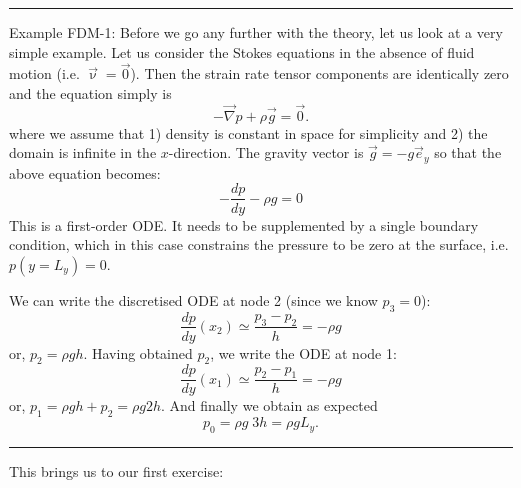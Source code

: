 \begin{center}
\begin{minipage}[t]{0.77\textwidth}
\par\noindent\rule{\textwidth}{0.4pt}
{\color{blue}Example FDM-1:} Before we go any further with the theory, let us look at a very simple example. 
Let us consider the Stokes equations in the absence of fluid motion (i.e. $\vec\upnu=\vec 0$).
Then the strain rate tensor components are identically zero and the equation simply is 
\begin{equation}
-\vec\nabla p + \rho \vec{g} = \vec 0.
\end{equation}
where we assume that 1) density is constant in space for simplicity and 2)
the domain is infinite in the $x$-direction.
The gravity vector is $\vec{g}=-g \vec{e}_y$ so that the above equation 
becomes:
\begin{equation}
-\frac{dp}{dy} - \rho g = 0
\end{equation}
This is a first-order ODE. It needs to be supplemented by a single boundary condition, 
which in this case constrains the pressure to be zero at the surface, i.e. $p(y=L_y)=0$.

\begin{center}

\end{center}

We can write the discretised ODE at node 2 (since we know $p_3=0$):
\begin{equation}
\frac{dp}{dy}(x_2) \simeq \frac{p_3-p_2}{h} = -\rho g
\end{equation}
or, $p_2=\rho g h$. Having obtained $p_2$, we write the ODE at node 1:
\begin{equation}
\frac{dp}{dy}(x_1) \simeq \frac{p_2-p_1}{h} = -\rho g
\end{equation}
or, $p_1= \rho g h + p_2 = \rho g 2h$. And finally we obtain as expected
\begin{equation}
p_0 = \rho g \; 3h = \rho g L_y.
\end{equation}

\par\noindent\rule{\textwidth}{0.4pt}
\end{minipage}
\end{center}

\newpage
This brings us to our first exercise:

